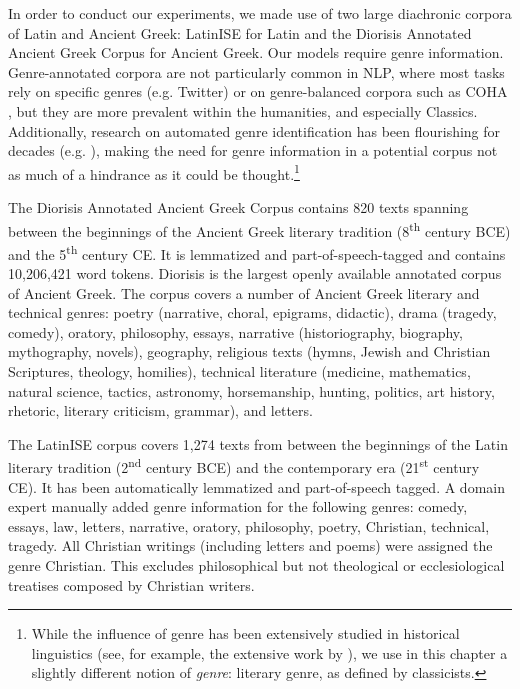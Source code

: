 \documentclass[output=paper]{langscibook}
\begin{document}
In order to conduct our experiments, we made use of two large diachronic corpora of Latin and Ancient Greek: LatinISE \citep{mcgillivray-kilgarriff} for Latin and the Diorisis Annotated Ancient Greek Corpus \citep{diorisis2018} for Ancient Greek. Our models require genre information.  
Genre-annotated corpora are not particularly common in NLP, where most tasks rely on specific genres (e.g. Twitter) or on genre-balanced corpora such as COHA \citep{davies2002corpus}, but they are more prevalent within the humanities, and especially Classics. 
Additionally, research on automated genre identification has been flourishing for decades (e.g. \citealt{kessler1997automatic}), making the need for genre information in a potential corpus not as much of a hindrance as it could be thought.\footnote{While the influence of genre has been extensively studied in historical linguistics (see, for example, the extensive work by \citealt{biber1989drift}), we use in this chapter a slightly different notion of \textit{genre}: literary genre, as defined by classicists.} 

The Diorisis Annotated Ancient Greek Corpus 
contains 820 texts spanning between the beginnings of the Ancient Greek literary tradition (8\textsuperscript{th} century BCE) and the 5\textsuperscript{th} century CE. It is  lemmatized and part-of-speech-tagged and contains 10,206,421 word tokens. Diorisis is the largest openly available annotated corpus of Ancient Greek. The corpus covers a number of Ancient Greek literary and technical genres: poetry (narrative, choral, epigrams, didactic), drama (tragedy, comedy), oratory, philosophy, essays, narrative (historiography, biography, mythography, novels), geography, religious texts (hymns, Jewish and Christian Scriptures, theology, homilies), technical literature (medicine, mathematics, natural science, tactics, astronomy, horsemanship, hunting, politics, art history, rhetoric, literary criticism, grammar), and letters. 


The LatinISE corpus \citep{mcgillivray-kilgarriff} covers 1,274 texts from between the beginnings of the Latin literary tradition (2\textsuperscript{nd} century BCE) and the contemporary era (21\textsuperscript{st} century CE). It has been automatically lemmatized and part-of-speech tagged. 
A domain expert manually added genre information for the following genres: comedy, essays, law, letters, narrative, oratory, philosophy, poetry, Christian, technical, tragedy. All Christian writings (including letters and poems) were assigned the genre Christian. This excludes philosophical but not theological or ecclesiological treatises composed by Christian writers. 
\end{document}
